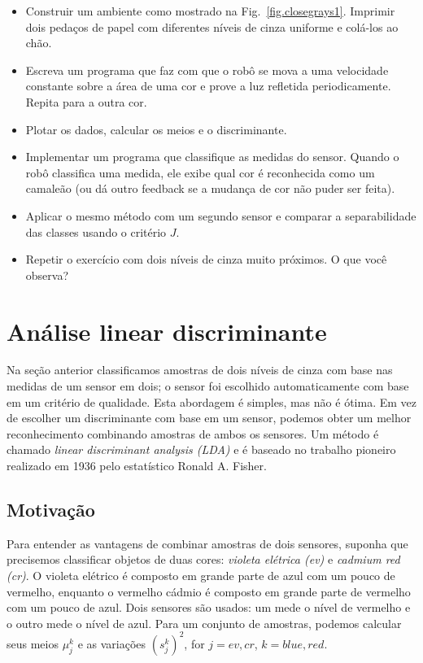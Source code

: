 \begin{framed}
\begin{itemize}
\item Construir um ambiente como mostrado na Fig.~\ref{fig.closegrays1}. Imprimir dois pedaços de papel com diferentes níveis de cinza uniforme e colá-los ao chão.
\item Escreva um programa que faz com que o robô se mova a uma velocidade constante sobre a área de uma cor e prove a luz refletida periodicamente. Repita para a outra cor.
\item Plotar os dados, calcular os meios e o discriminante.
\item Implementar um programa que classifique as medidas do sensor. Quando o robô classifica uma medida, ele exibe qual cor é reconhecida como um camaleão (ou dá outro feedback se a mudança de cor não puder ser feita).
\item Aplicar o mesmo método com um segundo sensor e comparar a separabilidade das classes usando o critério $J$.
\item Repetir o exercício com dois níveis de cinza muito próximos. O que você observa?
\end{itemize}
\end{framed}

\section{Análise linear discriminante}\label{s.lda}

Na seção anterior classificamos amostras de dois níveis de cinza com base nas medidas de um sensor em dois; o sensor foi escolhido automaticamente com base em um critério de qualidade. Esta abordagem é simples, mas não é ótima. Em vez de escolher um discriminante com base em um sensor, podemos obter um melhor reconhecimento combinando amostras de ambos os sensores. Um método é chamado \emph{linear discriminant analysis (LDA)} e é baseado no trabalho pioneiro realizado em 1936 pelo estatístico Ronald A. Fisher.

\subsection{Motivação}

Para entender as vantagens de combinar amostras de dois sensores, suponha que precisemos classificar objetos de duas cores: \emph{violeta elétrica (ev)} e \emph{cadmium red (cr)}. O violeta elétrico é composto em grande parte de azul com um pouco de vermelho, enquanto o vermelho cádmio é composto em grande parte de vermelho com um pouco de azul. Dois sensores são usados: um mede o nível de vermelho e o outro mede o nível de azul. Para um conjunto de amostras, podemos calcular seus meios $\mu_j^k$ e as variações $(s_j^k)^2$, for $j=\mathit{ev}, \mathit{cr}$, $k=\mathit{blue}, \mathit{red}$.

